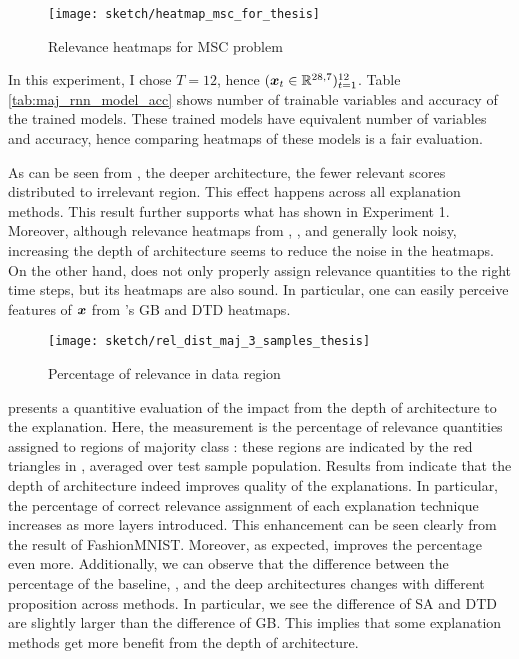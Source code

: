  \begin{figure}[h]
\centering
\texttt{[image: sketch/heatmap\_msc\_for\_thesis]}
\caption{Relevance heatmaps for MSC problem} 
\label{fig:heatmap_msc_mix_for_thesis}
\end{figure}

In this experiment, I chose $T=12$, hence $(\boldsymbol{x}_t \in \mathbb{R}^{28,7})_{t=1}^{12}$. Table \ref{tab:maj_rnn_model_acc} shows number of trainable variables and accuracy of the trained models. These trained models have equivalent number of variables and accuracy, hence comparing heatmaps of these models is a fair evaluation.

As can be seen from \addfigure{\ref{fig:heatmap_msc_mix_for_thesis}}, the deeper architecture, the fewer relevant scores distributed to irrelevant region. This effect happens across all explanation methods. This result further supports what has shown in Experiment 1.  Moreover, although relevance heatmaps from , , and  generally look noisy, increasing the depth of architecture seems to reduce the noise in the heatmaps.   On the other hand,  does not  only properly assign relevance quantities to the right time steps, but its heatmaps are also sound. In particular, one can easily perceive features of $\boldsymbol{x}$ from 's GB and DTD heatmaps.


 \begin{figure}[h]
\centering
\texttt{[image: sketch/rel\_dist\_maj\_3\_samples\_thesis]}
\caption{Percentage of relevance in data region} 
\label{fig:rel_dist_maj_3_samples_thesis}
\end{figure}

\addfigure{\ref{fig:rel_dist_maj_3_samples_thesis}} presents a quantitive  evaluation of the impact from the depth of architecture to the explanation. Here, the measurement is the percentage of relevance quantities assigned to regions of majority class : these regions are indicated by the red triangles in \addfigure{\ref{fig:heatmap_msc_mix_for_thesis}}, averaged over test sample population. Results from \addfigure{\ref{fig:rel_dist_maj_3_samples_thesis}} indicate that the depth of architecture indeed improves quality of the explanations. In particular, the percentage of correct relevance assignment of each explanation technique increases as more layers introduced. This enhancement can be seen clearly from the result of FashionMNIST. Moreover, as expected,  improves the percentage even more. Additionally, we can observe that the difference between the  percentage of the baseline, , and the deep architectures changes with different proposition across methods. In particular, we see the difference of SA and DTD are slightly larger than the difference of GB. This implies that some explanation methods get more benefit from the depth of architecture.

